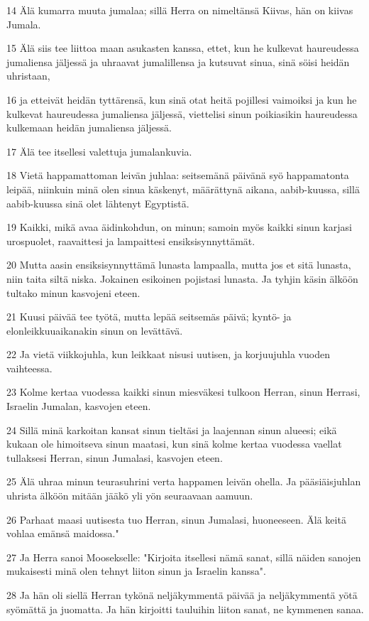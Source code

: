 \par 14 Älä kumarra muuta jumalaa; sillä Herra on nimeltänsä Kiivas, hän on kiivas Jumala.
\par 15 Älä siis tee liittoa maan asukasten kanssa, ettet, kun he kulkevat haureudessa jumaliensa jäljessä ja uhraavat jumalillensa ja kutsuvat sinua, sinä söisi heidän uhristaan,
\par 16 ja etteivät heidän tyttärensä, kun sinä otat heitä pojillesi vaimoiksi ja kun he kulkevat haureudessa jumaliensa jäljessä, viettelisi sinun poikiasikin haureudessa kulkemaan heidän jumaliensa jäljessä.
\par 17 Älä tee itsellesi valettuja jumalankuvia.
\par 18 Vietä happamattoman leivän juhlaa: seitsemänä päivänä syö happamatonta leipää, niinkuin minä olen sinua käskenyt, määrättynä aikana, aabib-kuussa, sillä aabib-kuussa sinä olet lähtenyt Egyptistä.
\par 19 Kaikki, mikä avaa äidinkohdun, on minun; samoin myös kaikki sinun karjasi urospuolet, raavaittesi ja lampaittesi ensiksisynnyttämät.
\par 20 Mutta aasin ensiksisynnyttämä lunasta lampaalla, mutta jos et sitä lunasta, niin taita siltä niska. Jokainen esikoinen pojistasi lunasta. Ja tyhjin käsin älköön tultako minun kasvojeni eteen.
\par 21 Kuusi päivää tee työtä, mutta lepää seitsemäs päivä; kyntö- ja elonleikkuuaikanakin sinun on levättävä.
\par 22 Ja vietä viikkojuhla, kun leikkaat nisusi uutisen, ja korjuujuhla vuoden vaihteessa.
\par 23 Kolme kertaa vuodessa kaikki sinun miesväkesi tulkoon Herran, sinun Herrasi, Israelin Jumalan, kasvojen eteen.
\par 24 Sillä minä karkoitan kansat sinun tieltäsi ja laajennan sinun alueesi; eikä kukaan ole himoitseva sinun maatasi, kun sinä kolme kertaa vuodessa vaellat tullaksesi Herran, sinun Jumalasi, kasvojen eteen.
\par 25 Älä uhraa minun teurasuhrini verta happamen leivän ohella. Ja pääsiäisjuhlan uhrista älköön mitään jääkö yli yön seuraavaan aamuun.
\par 26 Parhaat maasi uutisesta tuo Herran, sinun Jumalasi, huoneeseen. Älä keitä vohlaa emänsä maidossa."
\par 27 Ja Herra sanoi Moosekselle: "Kirjoita itsellesi nämä sanat, sillä näiden sanojen mukaisesti minä olen tehnyt liiton sinun ja Israelin kanssa".
\par 28 Ja hän oli siellä Herran tykönä neljäkymmentä päivää ja neljäkymmentä yötä syömättä ja juomatta. Ja hän kirjoitti tauluihin liiton sanat, ne kymmenen sanaa.
